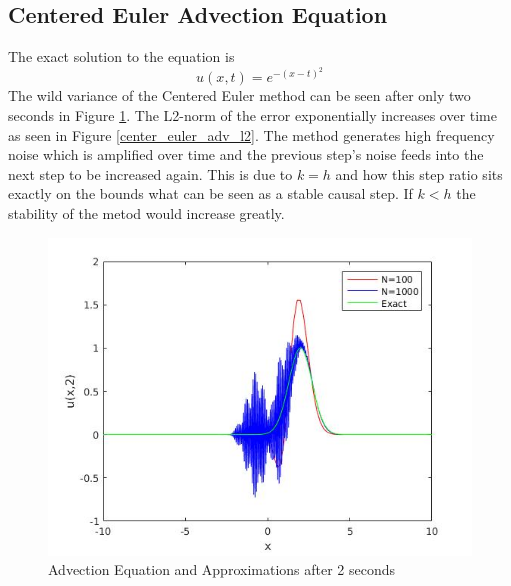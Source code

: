 \subsection{Centered Euler Advection Equation}
The exact solution to the equation is
\begin{equation}
u(x,t) = e^{-(x-t)^2}
\end{equation}
The wild variance of the Centered Euler method can be seen after only two seconds in Figure \ref{center_euler_adv}. The L2-norm of the error exponentially increases over time as seen in Figure \ref{center_euler_adv_l2}. The method generates high frequency noise which is amplified over time and the previous step's noise feeds into the next step to be increased again. This is due to $k=h$ and how this step ratio sits exactly on the bounds what can be seen as a stable causal step. If $k<h$ the stability of the metod would increase greatly.
\begin{figure}[H]
 \centering
 \includegraphics[scale=0.5]{Images/center_euler_adv.jpg}
 \caption{Advection Equation and Approximations after 2 seconds}
 \label{center_euler_adv}
\end{figure}
